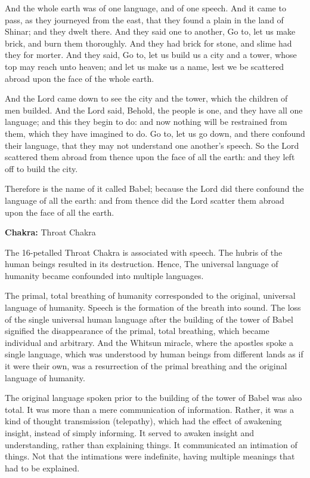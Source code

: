 \begin{quotex}
And the whole earth was of one language, and of one speech. And it came to pass, as they journeyed from the east, that they found a plain in the land of Shinar; and they dwelt there. And they said one to another, Go to, let us make brick, and burn them thoroughly. And they had brick for stone, and slime had they for morter. And they said, Go to, let us build us a city and a tower, whose top may reach unto heaven; and let us make us a name, lest we be scattered abroad upon the face of the whole earth.

And the Lord came down to see the city and the tower, which the children of men builded. And the Lord said, Behold, the people is one, and they have all one language; and this they begin to do: and now nothing will be restrained from them, which they have imagined to do. Go to, let us go down, and there confound their language, that they may not understand one another's speech. So the Lord scattered them abroad from thence upon the face of all the earth: and they left off to build the city.

Therefore is the name of it called Babel; because the Lord did there confound the language of all the earth: and from thence did the Lord scatter them abroad upon the face of all the earth. 

\end{quotex}

\textbf{Chakra:} Throat Chakra


The 16-petalled Throat Chakra is associated with speech. The hubris of the human beings resulted in its destruction. Hence, The universal language of humanity became confounded into multiple languages.


The primal, total breathing of humanity corresponded to the original, universal language of humanity. Speech is the formation of the breath into sound. The loss of the single universal human language after the building of the tower of Babel signified the disappearance of the primal, total breathing, which became individual and arbitrary. And the Whitsun miracle, where the apostles spoke a single language, which was understood by human beings from different lands as if it were their own, was a resurrection of the primal breathing and the original language of humanity.

The original language spoken prior to the building of the tower of Babel was also total. It was more than a mere communication of information. Rather, it was a kind of thought transmission (telepathy), which had the effect of awakening insight, instead of simply informing. It served to awaken insight and understanding, rather than explaining things. It communicated an intimation of things. Not that the intimations were indefinite, having multiple meanings that had to be explained.


